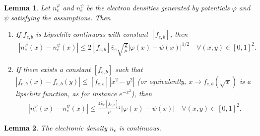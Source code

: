 \documentclass{article}
\newtheorem{lem}{Lemma}[section]
\numberwithin{equation}{section}
\newcommand{\intern}[1]{{\color{RoyalBlue} #1}} %
\newcommand{\ve}{{\overline{v}_e}} %
\newcommand{\lipfe}{{[f_{e,b}]}} %
\newcommand{\lipfesq}{{[f_{e,b}]_{2}}} %
\begin{document}
\begin{lem}\label{lem:ne_continuous_phi}
	Let $n_e^{\varphi}$ and $n_e^{\psi}$ be the electron densities generated by potentials $\varphi$ and $\psi$ satisfying the assumptions. Then
	\begin{enumerate}
	\item If $f_{e,b}$ is Lipschitz-continuous with constant $\lipfe$, then 
	\begin{align*}
		|n_e^{\varphi}(x) - n_e^{\psi}(x)| \leqslant 2 \lipfe \ve \sqrt{\frac{2}{\mu}}\left|\varphi(x) -\psi(x)\right|^{1/2} \quad \forall (x,y) \in [0,1]^2.
	\end{align*}
	\item If there exists a constant $[f_{e,b}]$ such that $|f_{e,b}(x) - f_{e,b}(y)| \leqslant [f_{e,b}] |x^2 - y^2|$ \intern{(or equivalently, $x \to f_{e,b}(\sqrt{x})$ is a lipschitz function, as for instance $e^{-x^2}$)}, then 
	\begin{align*}
		|n_e^{\varphi}(x) - n_e^{\psi}(x)| \leqslant \frac{4\ve \lipfesq}{\mu} \left|\varphi(x) - \psi(x)\right| \quad \forall (x,y) \in [0,1]^2.
	\end{align*}
	\end{enumerate}
\end{lem}

\begin{lem}
	The electronic density $n_e$ is continuous.
\end{lem}
\end{document}

